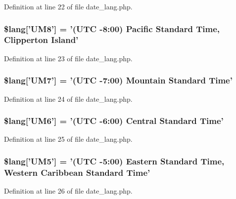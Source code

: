 Definition at line 22 of file date\-\_\-lang.\-php.

\subsubsection[{\$lang}]{\setlength{\rightskip}{0pt plus 5cm}\$lang['U\-M8'] = '(U\-T\-C -\/8\-:00) Pacific Standard Time, Clipperton Island'}\label{date__lang_8php_ab3ed4c273fcb61197ef7d8e4bae07415}


Definition at line 23 of file date\-\_\-lang.\-php.

\subsubsection[{\$lang}]{\setlength{\rightskip}{0pt plus 5cm}\$lang['U\-M7'] = '(U\-T\-C -\/7\-:00) Mountain Standard Time'}\label{date__lang_8php_aa642f12cf461f915682b17c0c30b2475}


Definition at line 24 of file date\-\_\-lang.\-php.

\subsubsection[{\$lang}]{\setlength{\rightskip}{0pt plus 5cm}\$lang['U\-M6'] = '(U\-T\-C -\/6\-:00) Central Standard Time'}\label{date__lang_8php_a30f39dd7748d488f4a0140751336d257}


Definition at line 25 of file date\-\_\-lang.\-php.

\subsubsection[{\$lang}]{\setlength{\rightskip}{0pt plus 5cm}\$lang['U\-M5'] = '(U\-T\-C -\/5\-:00) Eastern Standard Time, Western Caribbean Standard Time'}\label{date__lang_8php_a557150a51633e11dc49e3bfd2e1c091e}


Definition at line 26 of file date\-\_\-lang.\-php.

